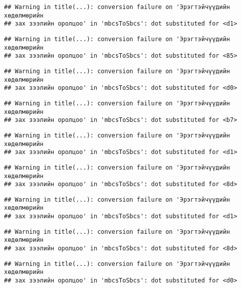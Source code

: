 \documentclass[]{article}
\begin{document}
\begin{verbatim}
## Warning in title(...): conversion failure on 'Эрэгтэйчүүдийн хөдөлмөрийн
## зах зээлийн оролцоо' in 'mbcsToSbcs': dot substituted for <d1>
\end{verbatim}

\begin{verbatim}
## Warning in title(...): conversion failure on 'Эрэгтэйчүүдийн хөдөлмөрийн
## зах зээлийн оролцоо' in 'mbcsToSbcs': dot substituted for <85>
\end{verbatim}

\begin{verbatim}
## Warning in title(...): conversion failure on 'Эрэгтэйчүүдийн хөдөлмөрийн
## зах зээлийн оролцоо' in 'mbcsToSbcs': dot substituted for <d0>
\end{verbatim}

\begin{verbatim}
## Warning in title(...): conversion failure on 'Эрэгтэйчүүдийн хөдөлмөрийн
## зах зээлийн оролцоо' in 'mbcsToSbcs': dot substituted for <b7>
\end{verbatim}

\begin{verbatim}
## Warning in title(...): conversion failure on 'Эрэгтэйчүүдийн хөдөлмөрийн
## зах зээлийн оролцоо' in 'mbcsToSbcs': dot substituted for <d1>
\end{verbatim}

\begin{verbatim}
## Warning in title(...): conversion failure on 'Эрэгтэйчүүдийн хөдөлмөрийн
## зах зээлийн оролцоо' in 'mbcsToSbcs': dot substituted for <8d>
\end{verbatim}

\begin{verbatim}
## Warning in title(...): conversion failure on 'Эрэгтэйчүүдийн хөдөлмөрийн
## зах зээлийн оролцоо' in 'mbcsToSbcs': dot substituted for <d1>
\end{verbatim}

\begin{verbatim}
## Warning in title(...): conversion failure on 'Эрэгтэйчүүдийн хөдөлмөрийн
## зах зээлийн оролцоо' in 'mbcsToSbcs': dot substituted for <8d>
\end{verbatim}

\begin{verbatim}
## Warning in title(...): conversion failure on 'Эрэгтэйчүүдийн хөдөлмөрийн
## зах зээлийн оролцоо' in 'mbcsToSbcs': dot substituted for <d0>
\end{verbatim}
\end{document}
